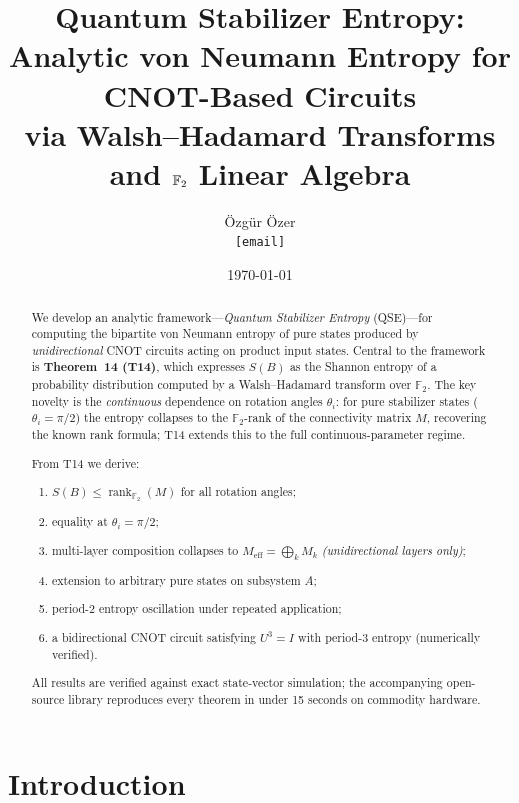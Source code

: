 \documentclass[11pt,a4paper]{article}
\title{%
  \textbf{Quantum Stabilizer Entropy:}\\
  Analytic von Neumann Entropy for CNOT-Based Circuits\\[0.5em]
  \large via Walsh--Hadamard Transforms and $\F_2$ Linear Algebra
}
\author{
  \"Ozg\"ur \"Ozer\\
  \small \texttt{[email]}
}
\date{\today}
\newcommand{\F}{\mathbb{F}}
\newcommand{\rk}{\operatorname{rank}_{\F_2}}
\newcommand{\VNE}{S}
\begin{document}
\maketitle

\begin{abstract}
We develop an analytic framework---\emph{Quantum Stabilizer Entropy} (QSE)---for
computing the bipartite von Neumann entropy of pure states produced by
\emph{unidirectional} CNOT circuits acting on product input states.
Central to the framework is \textbf{Theorem~14 (T14)}, which expresses
$\VNE(B)$ as the Shannon entropy of a probability distribution computed by a
Walsh--Hadamard transform over $\F_2$.  The key novelty is the
\emph{continuous} dependence on rotation angles $\theta_i$: for pure
stabilizer states ($\theta_i = \pi/2$) the entropy collapses to the
$\F_2$-rank of the connectivity matrix $M$, recovering the known rank formula;
T14 extends this to the full continuous-parameter regime.

From T14 we derive:
\begin{enumerate}
  \item[(T-RANK)] $\VNE(B) \leq \rk(M)$ for all rotation angles;
  \item[(T-OPT)]  equality at $\theta_i = \pi/2$;
  \item[(T15A)]   multi-layer composition collapses to $M_{\text{eff}} = \bigoplus_k M_k$
                  \emph{(unidirectional layers only)};
  \item[(T17)]    extension to arbitrary pure states on subsystem $A$;
  \item[(T18)]    period-2 entropy oscillation under repeated application;
  \item[(T20)]    a bidirectional CNOT circuit satisfying $U^3 = I$ with
                  period-3 entropy (numerically verified).
\end{enumerate}
All results are verified against exact state-vector simulation;
the accompanying open-source library reproduces every theorem in under
15 seconds on commodity hardware.
\end{abstract}

\tableofcontents
\bigskip

\section{Introduction}
\label{sec:intro}
\end{document}
